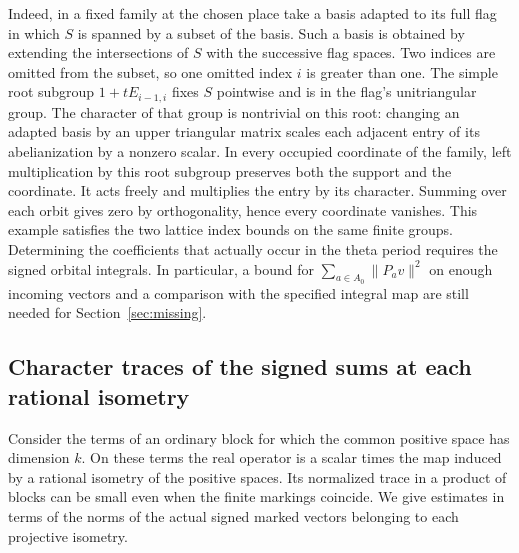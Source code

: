 \documentclass[a4paper,11pt]{article}
\theoremstyle{definition}
\theoremstyle{remark}
\numberwithin{equation}{section}
\begin{document}
Indeed, in a fixed family at the chosen place take a basis adapted
to its full flag in which \(S\) is spanned by a subset of the basis.
Such a basis is obtained by extending the intersections of \(S\)
with the successive flag spaces. Two indices are omitted from the
subset, so one omitted index \(i\) is greater than one. The simple
root subgroup \(1+tE_{i-1,i}\) fixes \(S\) pointwise and is in
the flag's unitriangular group. The character of that group is
nontrivial on this root: changing an adapted basis by an upper
triangular matrix scales each adjacent entry of its abelianization
by a nonzero scalar. In every occupied coordinate of the family,
left multiplication by this root subgroup preserves both the
support and the coordinate. It acts freely and multiplies the
entry by its character. Summing over each orbit gives zero by
orthogonality, hence every coordinate vanishes.
This example satisfies the two lattice index bounds on the same
finite groups. Determining the coefficients that actually occur
in the theta period requires the signed orbital integrals. In
particular, a bound for \(\sum_{a\in A_0}\|P_av\|^2\) on enough
incoming vectors and a comparison with the specified integral
map are still needed for Section~\ref{sec:missing}.


\subsection{Character traces of the signed sums at each rational isometry}
\label{sec:signedtraces635}

Consider the terms of an ordinary block for which the common
positive space has dimension \(k\). On these terms the real
operator is a scalar times the map induced by a rational isometry
of the positive spaces. Its normalized trace in a product of
blocks can be small even when the finite markings coincide.
We give estimates in terms of the norms of the actual signed
marked vectors belonging to each projective isometry.
\end{document}
